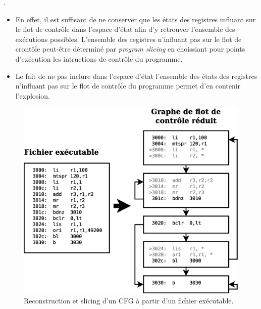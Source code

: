 \documentclass[final]{beamer}
\begin{document}
\begin{frame}
\begin{textblock}{39}
\begin{block}{\thesection. \secname}
\begin{itemize}
          \item[] En effet, il est suffisant de ne conserver que les états des
            registres influant sur le flot de contrôle dans l'espace d'état afin
            d'y retrouver l'ensemble des exécutions possibles. L'ensemble des
            registres n'influant pas sur le flot de crontôle peut-être déterminé
            par \textit{program slicing} en choissiant pour points d'exécution
            les intructions de contrôle du programme.
            \vspace{.5em}

          \item[] Le fait de ne pas inclure dans l'espace d'état l'ensemble des
            états des registres n'influant pas sur le flot de contrôle du
            programme permet d'en contenir l'explosion.
        \end{itemize}

        \begin{figure}
          \centering
          \includegraphics[scale=1]{cfg.eps}
          \caption{Reconstruction et slicing d'un CFG à partir d'un fichier
              exécutable.}
        \end{figure}
        \vspace{.4em}
      \end{block}
      \vspace{1em}


\end{textblock}
\end{frame}
\end{document}
